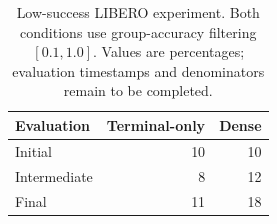 \begin{table}[t]
\caption{Low-success LIBERO experiment. Both conditions use group-accuracy filtering $[0.1,1.0]$. Values are percentages; evaluation timestamps and denominators remain to be completed.}
\label{tab:libero_low}\centering\small
\begin{tabular}{@{}lrr@{}}\toprule
Evaluation & Terminal-only & Dense\\\midrule
Initial & 10 & 10\\
Intermediate & 8 & 12\\
Final & 11 & 18\\\bottomrule
\end{tabular}
\end{table}
